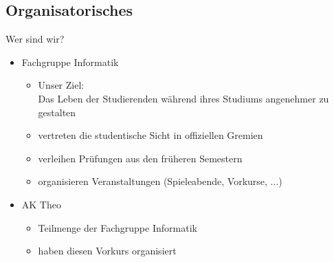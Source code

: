 \subsection{Organisatorisches}
\begin{frame}[fragile]{Wer sind wir?}
    \begin{itemize}
        \item 
            Fachgruppe Informatik
            \begin{itemize}
                \item Unser Ziel: \\
                Das Leben der Studierenden während ihres Studiums angenehmer zu gestalten
                \item vertreten die studentische Sicht in offiziellen Gremien
                \item verleihen Prüfungen aus den früheren Semestern
                \item organisieren Veranstaltungen (Spieleabende, Vorkurse, ...)
            \end{itemize}
        \item AK Theo
        \begin{itemize}
            \item Teilmenge der Fachgruppe Informatik
            \item haben diesen Vorkurs organisiert
        \end{itemize}
    \end{itemize}
\end{frame}

